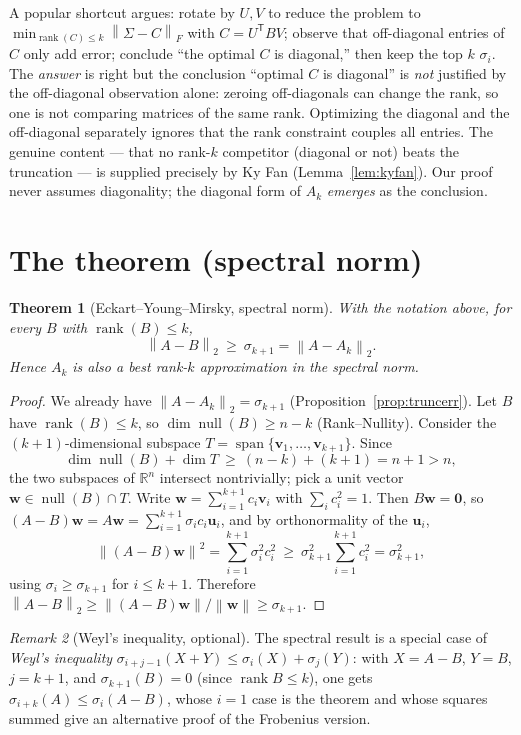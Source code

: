 \documentclass[11pt,oneside]{book}
\theoremstyle{plain}
\newtheorem{theorem}{Theorem}[chapter]
\theoremstyle{definition}
\theoremstyle{remark}
\newtheorem{remark}[theorem]{Remark}
\newcommand{\R}{\mathbb{R}}
\newcommand{\rank}{\operatorname{rank}}
\newcommand{\nul}{\operatorname{null}}
\newcommand{\spn}{\operatorname{span}}
\newcommand{\dimm}{\operatorname{dim}}
\newcommand{\norm}[1]{\left\lVert #1 \right\rVert}
\newcommand{\fn}[1]{\norm{#1}_F}
\newcommand{\sn}[1]{\norm{#1}_2}
\newcommand{\T}{^{\mathsf T}}
\newcommand{\bu}{\mathbf{u}}
\newcommand{\bv}{\mathbf{v}}
\newcommand{\bw}{\mathbf{w}}
\newcommand{\bzero}{\mathbf{0}}
\begin{document}
\begin{miscon_box}
A popular shortcut argues: rotate by $U,V$ to reduce the problem to
$\min_{\rank(C)\le k}\fn{\Sigma-C}$ with $C=U\T BV$; observe that off-diagonal entries of
$C$ only add error; conclude ``the optimal $C$ is diagonal,'' then keep the top $k$
$\sigma_i$. The \emph{answer} is right but the conclusion ``optimal $C$ is diagonal'' is
\emph{not} justified by the off-diagonal observation alone: zeroing off-diagonals can
change the rank, so one is not comparing matrices of the same rank. Optimizing the
diagonal and the off-diagonal separately ignores that the rank constraint couples all
entries. The genuine content --- that no rank-$k$ competitor (diagonal or not) beats the
truncation --- is supplied precisely by Ky Fan (Lemma~\ref{lem:kyfan}). Our proof never
assumes diagonality; the diagonal form of $A_k$ \emph{emerges} as the conclusion.
\end{miscon_box}

\section{The theorem (spectral norm)}

\begin{theorem}[Eckart--Young--Mirsky, spectral norm]\label{thm:eys}
With the notation above, for every $B$ with $\rank(B)\le k$,
\[
\sn{A-B}\ \ge\ \sigma_{k+1}=\sn{A-A_k}.
\]
Hence $A_k$ is also a best rank-$k$ approximation in the spectral norm.
\end{theorem}
\begin{proof}
We already have $\sn{A-A_k}=\sigma_{k+1}$ (Proposition~\ref{prop:truncerr}). Let $B$ have
$\rank(B)\le k$, so $\dimm\nul(B)\ge n-k$ (Rank--Nullity). Consider the
$(k+1)$-dimensional subspace $T=\spn\{\bv_1,\dots,\bv_{k+1}\}$. Since
\[
\dimm\nul(B)+\dimm T\ \ge\ (n-k)+(k+1)=n+1>n,
\]
the two subspaces of $\R^n$ intersect nontrivially; pick a unit vector
$\bw\in\nul(B)\cap T$. Write $\bw=\sum_{i=1}^{k+1}c_i\bv_i$ with $\sum_i c_i^2=1$. Then
$B\bw=\bzero$, so $(A-B)\bw=A\bw=\sum_{i=1}^{k+1}\sigma_ic_i\bu_i$, and by orthonormality
of the $\bu_i$,
\[
\norm{(A-B)\bw}^2=\sum_{i=1}^{k+1}\sigma_i^2c_i^2\ \ge\
\sigma_{k+1}^2\sum_{i=1}^{k+1}c_i^2=\sigma_{k+1}^2 ,
\]
using $\sigma_i\ge\sigma_{k+1}$ for $i\le k+1$. Therefore
$\sn{A-B}\ge\norm{(A-B)\bw}/\norm{\bw}\ge\sigma_{k+1}$.
\end{proof}

\begin{remark}[Weyl's inequality, optional]
The spectral result is a special case of \emph{Weyl's inequality}
$\sigma_{i+j-1}(X+Y)\le\sigma_i(X)+\sigma_j(Y)$: with $X=A-B$, $Y=B$, $j=k+1$, and
$\sigma_{k+1}(B)=0$ (since $\rank B\le k$), one gets
$\sigma_{i+k}(A)\le\sigma_i(A-B)$, whose $i=1$ case is the theorem and whose squares
summed give an alternative proof of the Frobenius version.
\end{remark}
\end{document}
